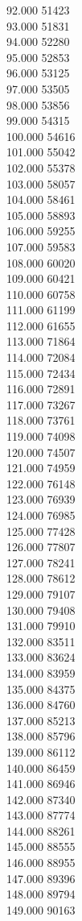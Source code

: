 { 92.000	51423 \\
 93.000	51831 \\
 94.000	52280 \\
 95.000	52853 \\
 96.000	53125 \\
 97.000	53505 \\
 98.000	53856 \\
 99.000	54315 \\
 100.000	54616 \\
 101.000	55042 \\
 102.000	55378 \\
 103.000	58057 \\
 104.000	58461 \\
 105.000	58893 \\
 106.000	59255 \\
 107.000	59583 \\
 108.000	60020 \\
 109.000	60421 \\
 110.000	60758 \\
 111.000	61199 \\
 112.000	61655 \\
 113.000	71864 \\
 114.000	72084 \\
 115.000	72434 \\
 116.000	72891 \\
 117.000	73267 \\
 118.000	73761 \\
 119.000	74098 \\
 120.000	74507 \\
 121.000	74959 \\
 122.000	76148 \\
 123.000	76939 \\
 124.000	76985 \\
 125.000	77428 \\
 126.000	77807 \\
 127.000	78241 \\
 128.000	78612 \\
 129.000	79107 \\
 130.000	79408 \\
 131.000	79910 \\
 132.000	83511 \\
 133.000	83624 \\
 134.000	83959 \\
 135.000	84375 \\
 136.000	84760 \\
 137.000	85213 \\
 138.000	85796 \\
 139.000	86112 \\
 140.000	86459 \\
 141.000	86946 \\
 142.000	87340 \\
 143.000	87774 \\
 144.000	88261 \\
 145.000	88555 \\
 146.000	88955 \\
 147.000	89396 \\
 148.000	89794 \\
 149.000	90163 \\
}
